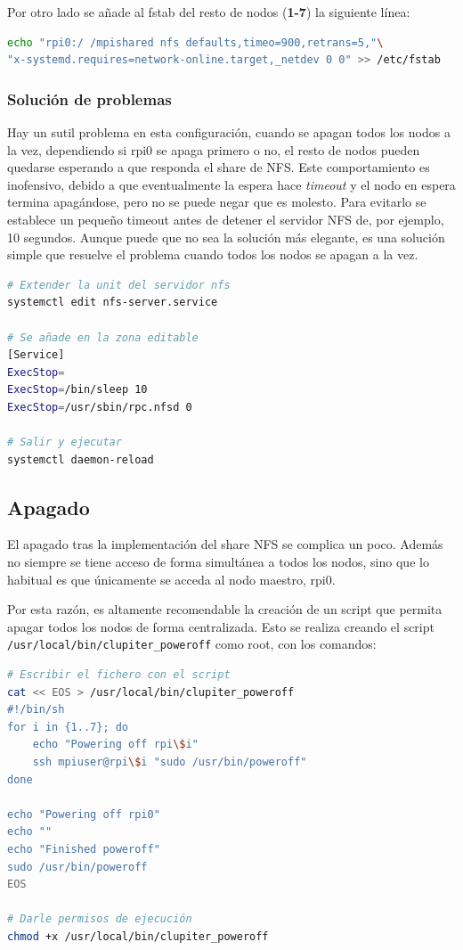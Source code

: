 Por otro lado se añade al fstab del resto de nodos (\textbf{1-7}) la siguiente línea:
\begin{lstlisting}[language=bash]
echo "rpi0:/ /mpishared nfs defaults,timeo=900,retrans=5,"\
"x-systemd.requires=network-online.target,_netdev 0 0" >> /etc/fstab
\end{lstlisting}

\subsubsection{Solución de problemas}
Hay un sutil problema en esta configuración, cuando se apagan todos los nodos a la vez, dependiendo si rpi0 se apaga primero o no, el resto de nodos pueden quedarse esperando a que responda el share de NFS. Este comportamiento es inofensivo, debido a que eventualmente la espera hace \textit{timeout} y el nodo en espera termina apagándose, pero no se puede negar que es molesto. Para evitarlo se establece un pequeño timeout antes de detener el servidor NFS de, por ejemplo, 10 segundos. Aunque puede que no sea la solución más elegante, es una solución simple que resuelve el problema cuando todos los nodos se apagan a la vez.

\begin{lstlisting}[language=bash]
# Extender la unit del servidor nfs
systemctl edit nfs-server.service

# Se añade en la zona editable
[Service]
ExecStop=
ExecStop=/bin/sleep 10
ExecStop=/usr/sbin/rpc.nfsd 0

# Salir y ejecutar
systemctl daemon-reload
\end{lstlisting}

\subsection{Apagado}
\label{ssec:apagado_impl}
El apagado tras la implementación del share NFS se complica un poco. Además no siempre se tiene acceso de forma simultánea a todos los nodos, sino que lo habitual es que únicamente se acceda al nodo maestro, rpi0.

Por esta razón, es altamente recomendable la creación de un script que permita apagar todos los nodos de forma centralizada. Esto se realiza creando el script \texttt{/usr/local/bin/clupiter\_poweroff} como root, con los comandos:

\begin{lstlisting}[language=bash]
# Escribir el fichero con el script
cat << EOS > /usr/local/bin/clupiter_poweroff
#!/bin/sh
for i in {1..7}; do
    echo "Powering off rpi\$i"
    ssh mpiuser@rpi\$i "sudo /usr/bin/poweroff"
done

echo "Powering off rpi0"
echo ""
echo "Finished poweroff"
sudo /usr/bin/poweroff
EOS

# Darle permisos de ejecución
chmod +x /usr/local/bin/clupiter_poweroff
\end{lstlisting}


